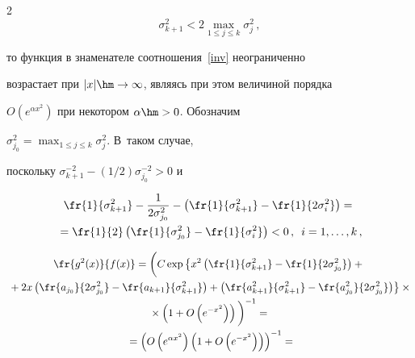 \begin{multicols}{2}
\begin{equation}

\label{CondSigmaNorm}

\sigma_{k+1}^2<2\max_{1\le j\le k}\sigma_j^2\,,

\end{equation}

то функция в знаменателе соотношения~\eqref{inv} неограниченно

возрастает при $|x|\hm\to\infty$, являясь при этом величиной порядка

$O\left(e^{\alpha x^2}\right)$ при некотором $\alpha\hm>0$. Обозначим

$\sigma_{j_0}^2=\max_{1\le j\le k}\sigma_j^2$. В~таком случае,

поскольку $\sigma_{k+1}^{-2}-({1}/{2})\sigma_{j_0}^{-2}>0$ и

\begin{multline*}

\fr{1}{\sigma_{k+1}^2}-\frac{1}{2\sigma_{j_0}^2}-

\left(\fr{1}{\sigma_{k+1}^2}-\fr{1}{2\sigma_i^2}\right)={}\\

{}=

\fr{1}{2}\left(\fr{1}{\sigma_{j_0}^2}-\fr{1}{\sigma_i^2}\right)<0\,,\enskip i=1,\ldots,k\,,

\end{multline*}



\vspace*{-12pt}



\noindent

\begin{multline*}

\fr{g^2(x)}{f(x)}=\bigg(C\exp\left\{x^2

\left(\fr{1}{\sigma_{k+1}^2}-\fr{1}{2\sigma_{j_0}^2}\right)

+{}\right.\\

\left.{}+2x\left(\fr{a_{j_0}}{2\sigma_{j_0}^2}-\fr{a_{k+1}}{\sigma_{k+1}^2}\right)

+\left(\fr{a_{k+1}^2}{\sigma_{k+1}^2}-\fr{a_{j_0}^2}{2\sigma_{j_0}^2}\right)\right\}

\times{}\\

{}\times\left(1+O\left(e^{-x^2}\right)\right)\bigg)^{-1}={}\\

{}=\left({O\left(e^{\alpha x^2}\right)\left(1+O\left(e^{-x^2}\right)\right)}\right)^{-1}=


\end{multline*}
\end{multicols}
